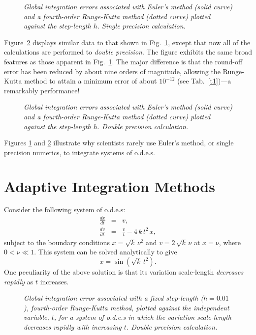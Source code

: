 \begin{figure}
\epsfysize=3in
\centerline{}
\caption{\em Global integration errors associated with Euler's method (solid curve) and a
fourth-order Runge-Kutta method (dotted curve) plotted
against the step-length $h$. Single precision calculation.}\label{f2x}
\end{figure}

Figure~\ref{f3x} displays similar data to that shown in Fig.~\ref{f2x}, except that now all 
of the calculations
are performed to {\em double precision}. The figure exhibits the same broad features as
those apparent in  Fig.~\ref{f2x}. The major difference is that the round-off error has
been reduced by about nine orders of magnitude, allowing the Runge-Kutta method to
attain a minimum error of about $10^{-12}$ (see Tab.~\ref{t1})---a remarkably performance!

\begin{figure}
\epsfysize=3in
\centerline{}
\caption{\em Global integration errors associated with Euler's method (solid curve) and a
fourth-order Runge-Kutta method (dotted curve) plotted
against the step-length $h$. Double precision calculation.}\label{f3x}
\end{figure}

Figures \ref{f2x} and \ref{f3x} illustrate why scientists rarely use Euler's method, or single
precision numerics, to integrate systems of o.d.e.s.

\section{Adaptive Integration Methods}
Consider the following system of o.d.e.s:
\begin{eqnarray}
\frac{dx}{dt} &=& v,\\[0.5ex]
\frac{dv}{dt} &=& \frac{v}{t} - 4\,k\,t^2\,x,
\end{eqnarray}
subject to the boundary conditions $x = \sqrt{k}\,\nu^2$ and $v = 2\,\sqrt{k}\,\nu$
at $x=\nu$, where $0<\nu\ll 1$. This system can be solved
analytically to give
\begin{equation}
x = \sin(\sqrt{k}\,t^2).
\end{equation}
One peculiarity of the above solution is that its  variation scale-length {\em decreases rapidly}
as $t$ increases.

\begin{figure}
\epsfysize=3in
\centerline{}
\caption{\em Global integration error associated with a
fixed step-length ($h=0.01$), fourth-order Runge-Kutta method,  plotted
against the independent variable, $t$, for a system of o.d.e.s
in which the variation scale-length decreases rapidly with
increasing $t$.  Double precision calculation.}\label{f4x}
\end{figure}

